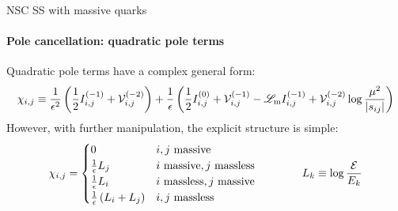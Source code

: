 
\begin{frame}{NSC SS with massive quarks}
  \framesubtitle{Pole cancellation: quadratic pole terms}

  Quadratic pole terms have a complex general form:
  \begin{equation*}
    \chi_{i,j} \equiv \frac{1}{\epsilon^2} \left( \frac{1}{2} I_{i,j}^{(-1)} + \mathcal{V}_{i,j}^{(-2)} \right) + \frac{1}{\epsilon} \left( \frac{1}{2} I_{i,j}^{(0)} + \mathcal{V}_{i,j}^{(-1)} - \mathscr{L}_\text{m} I_{i,j}^{(-1)} + \mathcal{V}_{i,j}^{(-2)} \log \frac{\mu^2}{\left\lvert s_{ij}\right\rvert} \right)
  \end{equation*}
  However, with further manipulation, the explicit structure is simple:
  \begin{equation*}
    \chi_{i,j} =
    \begin{cases}
      0 & i,j \text{ massive} \\
      \frac{1}{\epsilon} L_j & i \text{ massive}, j \text{ massless} \\
      \frac{1}{\epsilon} L_i & i \text{ massless}, j \text{ massive} \\
      \frac{1}{\epsilon} \left( L_i + L_j \right) & i,j \text{ massless} \\
    \end{cases}
    \qquad \qquad
    L_k \equiv \log \frac{\mathcal{E}}{E_k}
  \end{equation*}

\end{frame}


